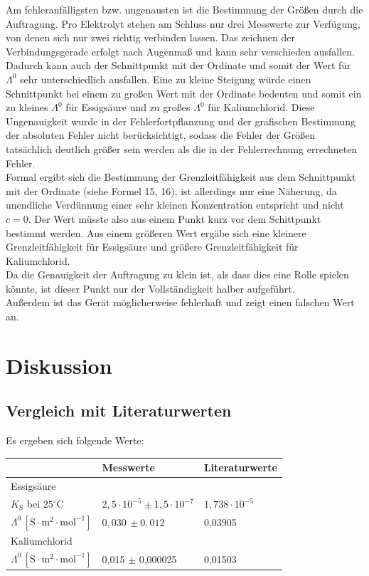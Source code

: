 \documentclass[12pt,a4paper,titlepage,headinclude,bibtotoc]{scrartcl}
\begin{document}
Am fehleranfälligsten bzw. ungenausten ist die Bestimmung der Größen durch die Auftragung. Pro Elektrolyt stehen am Schluss nur drei Messwerte zur Verfügung, von denen sich nur zwei richtig verbinden lassen. Das zeichnen der Verbindungsgerade erfolgt nach Augenmaß und kann sehr verschieden ausfallen. Dadurch kann auch der Schnittpunkt mit der Ordinate und somit der Wert für $\Lambda^0$ sehr unterschiedlich ausfallen. Eine zu kleine Steigung würde einen Schnittpunkt bei einem zu großen Wert mit der Ordinate bedeuten und somit ein zu kleines $\Lambda^0$ für Essigsäure und zu großes $\Lambda^0$ für Kaliumchlorid. Diese Ungenauigkeit wurde in der Fehlerfortpflanzung und der grafischen Bestimmung der absoluten Fehler nicht berücksichtigt, sodass die Fehler der Größen tatsächlich deutlich größer sein werden als die in der Fehlerrechnung errechneten Fehler.\\
Formal ergibt sich die Bestimmung der Grenzleitfähigkeit aus dem Schnittpunkt mit der Ordinate (siehe Formel 15, 16), ist allerdings nur eine Näherung, da unendliche Verdünnung einer sehr kleinen Konzentration entspricht und nicht $c=0$. Der Wert müsste also aus einem Punkt kurz vor dem Schittpunkt bestimmt werden. Aus einem größeren Wert ergäbe sich eine kleinere Grenzleitfähigkeit für Essigsäure und größere Grenzleitfähigkeit für Kaliumchlorid.\\
Da die Genauigkeit der Auftragung zu klein ist, als dass dies eine Rolle spielen könnte, ist dieser Punkt nur der Vollständigkeit halber aufgeführt.\\


Außerdem ist das Gerät möglicherweise fehlerhaft und zeigt einen falschen Wert an.\\




\newpage 

\section{Diskussion}
\subsection{Vergleich mit Literaturwerten}

Es ergeben sich folgende Werte:\\

\begin{table} [h]
\centering 
\begin{tabular}{p{3cm}|p{5cm}p{5cm}}
& Messwerte & Literaturwerte\footnotemark\\
\hline
Essigsäure & &\\
 $K_{\mathrm{S}}$  bei $25^\circ\text{C}$ & $2,5 \cdot 10^{-5} \pm 1,5 \cdot 10^{-7}$& $1,738 \cdot 10^{-5}$\\
$\Lambda^0\, [\mathrm{S} \cdot \mathrm{m^2} \cdot \mathrm{mol^{-1}}]$ & $ 0,030\, \pm 0,012 $& 0,03905\\
\hline
Kaliumchlorid & &\\
$\Lambda^0\, [\mathrm{S} \cdot \mathrm{m^2} \cdot \mathrm{mol^{-1}}]$ & 0,015 $\pm$ 0,000025 & 0,01503\\
\end{tabular}
\end{table}
\end{document}
